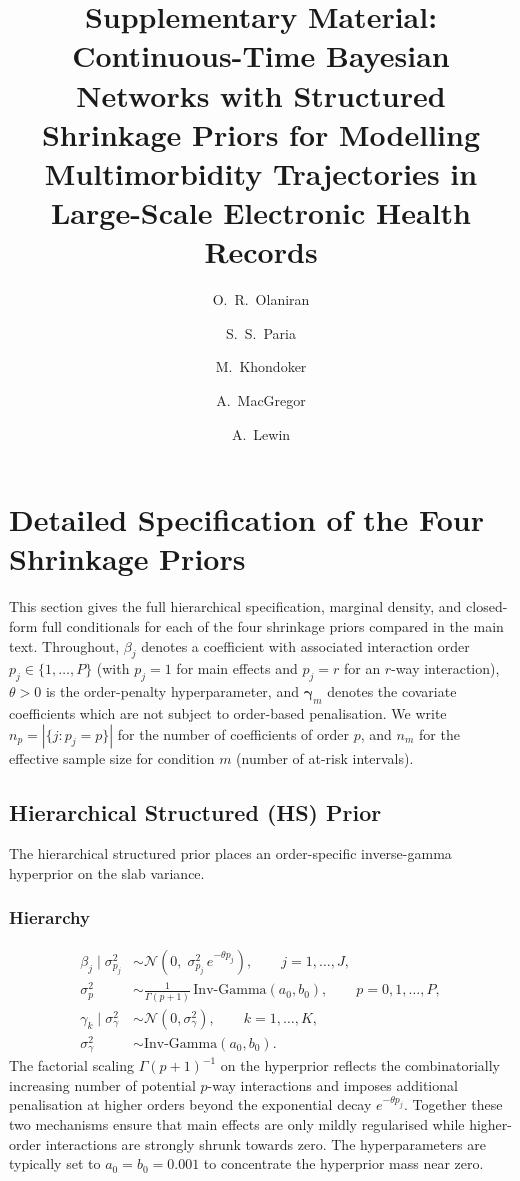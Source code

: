 \documentclass[12pt]{article}
\title{\textbf{Supplementary Material:\\
Continuous-Time Bayesian Networks with Structured Shrinkage
Priors for Modelling Multimorbidity Trajectories in Large-Scale
Electronic Health Records}}
\author[1]{O.~R.~Olaniran}
\author[1]{S.~S.~Paria}
\author[2]{M.~Khondoker}
\author[2]{A.~MacGregor}
\author[1]{A.~Lewin}
\affil[1]{Department of Medical Statistics, London School of Hygiene \&
Tropical Medicine, London, UK}
\affil[2]{University of East Anglia, Norwich, UK}
\date{}
\begin{document}
\maketitle
\thispagestyle{empty}

\tableofcontents

\clearpage

\section{Detailed Specification of the Four Shrinkage Priors}
\label{sec:supp_priors}

This section gives the full hierarchical specification, marginal density, and
closed-form full conditionals for each of the four shrinkage priors compared
in the main text. Throughout, $\beta_j$ denotes a coefficient with associated
interaction order $p_j \in \{1, \dots, P\}$ (with $p_j = 1$ for main effects
and $p_j = r$ for an $r$-way interaction), $\theta > 0$ is the order-penalty
hyperparameter, and $\boldsymbol{\gamma}_m$ denotes the covariate coefficients
which are not subject to order-based penalisation. We write $n_p = |\{j : p_j = p\}|$
for the number of coefficients of order $p$, and $n_m$ for the effective sample
size for condition $m$ (number of at-risk intervals).

\subsection{Hierarchical Structured (HS) Prior}

The hierarchical structured prior places an order-specific inverse-gamma
hyperprior on the slab variance.

\subsubsection{Hierarchy}
\begin{align}
\beta_j \mid \sigma^2_{p_j} &\sim \mathcal{N}\!\left(0,\; \sigma^2_{p_j}\, e^{-\theta p_j}\right), \qquad j = 1, \dots, J,\\
\sigma^2_p &\sim \frac{1}{\Gamma(p+1)}\,\mathrm{Inv\text{-}Gamma}(a_0, b_0), \qquad p = 0, 1, \dots, P,\\
\gamma_k \mid \sigma^2_\gamma &\sim \mathcal{N}(0, \sigma^2_\gamma), \qquad k = 1, \dots, K,\\
\sigma^2_\gamma &\sim \mathrm{Inv\text{-}Gamma}(a_0, b_0).
\end{align}
The factorial scaling $\Gamma(p+1)^{-1}$ on the hyperprior reflects the
combinatorially increasing number of potential $p$-way interactions and
imposes additional penalisation at higher orders beyond the exponential decay
$e^{-\theta p_j}$. Together these two mechanisms ensure that main effects are
only mildly regularised while higher-order interactions are strongly shrunk
towards zero. The hyperparameters are typically set to $a_0 = b_0 = 0.001$ to
concentrate the hyperprior mass near zero.
\end{document}
